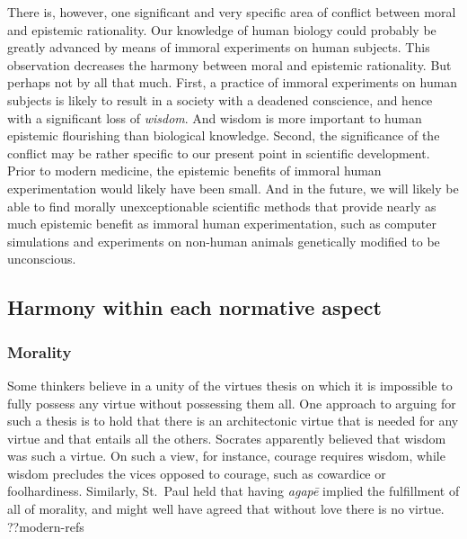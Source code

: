 There is, however, one significant and very specific area of conflict between moral and epistemic rationality. Our knowledge of human 
biology could probably be greatly advanced by means of immoral experiments on human subjects. This observation decreases
the harmony between moral and epistemic rationality. But perhaps not by all that much. First, a practice of immoral 
experiments on human subjects is likely to result in a society with a deadened conscience, and hence with a significant
loss of \textit{wisdom}. And wisdom is more important to human epistemic flourishing than biological knowledge. Second,
the significance of the conflict may be rather specific to our present point in scientific development. Prior to 
modern medicine, the epistemic benefits of immoral human experimentation would likely have been small. And in the 
future, we will likely be able to find morally unexceptionable scientific methods that provide nearly as much epistemic
benefit as immoral human experimentation, such as computer simulations and experiments on non-human animals genetically 
modified to be unconscious.

\subsection{Harmony within each normative aspect}
\subsubsection{Morality}
Some thinkers believe in a unity of the virtues thesis on which it is impossible to fully possess any virtue 
without possessing them all. One approach to arguing for such a thesis is to hold that there is an architectonic 
virtue that is needed for any virtue and that entails all the others. Socrates apparently believed that wisdom 
was such a virtue. On such a view, for instance, courage requires wisdom, while wisdom precludes the vices opposed 
to courage, such as cowardice or foolhardiness. Similarly, St.~Paul held that having \textit{agap\={e}} implied the 
fulfillment of all of morality, and might well have agreed that without love there is no virtue. ??modern-refs

